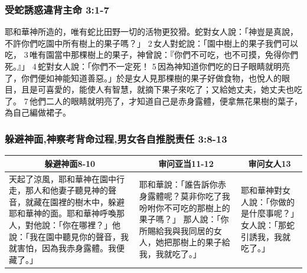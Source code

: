 \subsubsection{受蛇誘惑違背主命 3:1-7}
耶和華神所造的，唯有蛇比田野一切的活物更狡猾。蛇對女人說：「神豈是真說，不許你們吃園中所有樹上的果子嗎？」 2 女人對蛇說：「園中樹上的果子我們可以吃， 3 唯有園當中那棵樹上的果子，神曾說：『你們不可吃，也不可摸，免得你們死。』」 
4 蛇對女人說：「你們不一定死！ 5 因為神知道你們吃的日子眼睛就明亮了，你們便如神能知道善惡。」於是女人見那棵樹的果子好做食物，也悅人的眼目，且是可喜愛的，能使人有智慧，就摘下果子來吃了；又給她丈夫，她丈夫也吃了。 7 他們二人的眼睛就明亮了，才知道自己是赤身露體，便拿無花果樹的葉子，為自己編做裙子。

\subsubsection{躲避神面,神察考背命过程,男女各自推脱责任 3:8-13}
\begin{table}[H]
\centering
\begin{tabular}{p{}|p{5.250cm}|p{2.50cm}}\hline\hline
\multicolumn{1}{c|}{躲避神面8-10}&\multicolumn{1}{c|}{审问亚当11-12}&\multicolumn{1}{c}{审问女人13}\\\hline
天起了涼風，耶和華神在園中行走，那人和他妻子聽見神的聲音，就藏在園裡的樹木中，躲避耶和華神的面。耶和華神呼喚那人，對他說：「你在哪裡？」他說：「我在園中聽見你的聲音，我就害怕，因為我赤身露體。我便藏了。」 
&耶和華說：「誰告訴你赤身露體呢？莫非你吃了我吩咐你不可吃的那樹上的果子嗎？」 那人說：「你所賜給我與我同居的女人，她把那樹上的果子給我，我就吃了。」
&耶和華神對女人說：「你做的是什麼事呢？」女人說：「那蛇引誘我，我就吃了。」\\\hline
\end{tabular}
\end{table}

